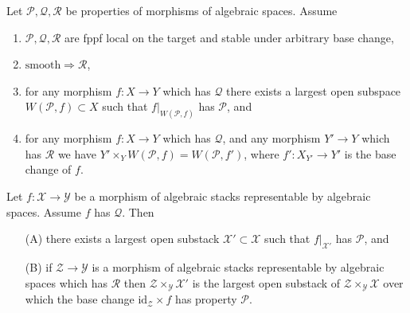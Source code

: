 \begin{lemma}
\label{lemma-local-source}
Let $\mathcal{P}, \mathcal{Q}, \mathcal{R}$ be properties of morphisms
of algebraic spaces. Assume
\begin{enumerate}
\item $\mathcal{P}, \mathcal{Q}, \mathcal{R}$ are fppf local on the target
and stable under arbitrary base change,
\item $\text{smooth} \Rightarrow \mathcal{R}$,
\item for any morphism $f : X \to Y$ which has $\mathcal{Q}$ there exists a
largest open subspace $W(\mathcal{P}, f) \subset X$ such that
$f|_{W(\mathcal{P}, f)}$ has $\mathcal{P}$, and
\item for any morphism $f : X \to Y$ which has $\mathcal{Q}$,
and any morphism $Y' \to Y$ which has $\mathcal{R}$ we have
$Y' \times_Y W(\mathcal{P}, f) = W(\mathcal{P}, f')$, where
$f' : X_{Y'} \to Y'$ is the base change of $f$.
\end{enumerate}
Let $f : \mathcal{X} \to \mathcal{Y}$ be a morphism of algebraic stacks
representable by algebraic spaces. Assume $f$ has $\mathcal{Q}$. Then
\begin{enumerate}
\item[(A)] there exists a largest open substack
$\mathcal{X}' \subset \mathcal{X}$ such that $f|_{\mathcal{X}'}$ has
$\mathcal{P}$, and
\item[(B)] if $\mathcal{Z} \to \mathcal{Y}$ is a morphism of algebraic
stacks representable by algebraic spaces which has $\mathcal{R}$
then $\mathcal{Z} \times_\mathcal{Y} \mathcal{X}'$ is the largest open
substack of $\mathcal{Z} \times_\mathcal{Y} \mathcal{X}$ over which
the base change $\text{id}_\mathcal{Z} \times f$ has property $\mathcal{P}$.
\end{enumerate}
\end{lemma}

